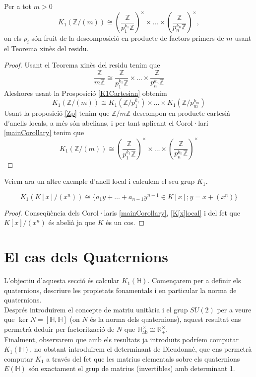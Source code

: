 \begin{prop}Per a tot $m>0$  \label{K1Zm}
$$
K_1(\mathbb{Z}/(m)) \cong \left(\frac{\mathbb{Z}}{p_1^{k_1}\mathbb{Z}}\right)^\times \times \dots \times \left(\frac{\mathbb{Z}}{p_n^{k_n}\mathbb{Z}}\right) ^ \times ,
$$
on els $p_i$ són fruit de la descomposició en producte de factors primers de $m$ usant el Teorema xinès del residu.
\end{prop}
\begin{proof}
Usant el Teorema xinès del residu tenim que 
$$
\frac{\mathbb{Z}}{m\mathbb{Z}} \cong \frac{\mathbb{Z}}{p_1^{k_1}\mathbb{Z}}\times \dots \times \frac{\mathbb{Z}}{p_n^{k_n}\mathbb{Z}}
$$
Aleshores usant la Prosposició \ref{K1Cartesian} obtenim
$$
K_1(\mathbb{Z}/(m)) \cong K_1(\mathbb{Z}/p_1^{k_1}) \times \dots \times K_1(\mathbb{Z}/p_m^{k_m})
$$
Usant la proposició \ref{Zp} tenim que $\mathbb{Z}/m\mathbb{Z}$ descompon en producte cartesià d'anells locals, a més són abelians, i per tant aplicant el Corol·lari \ref{mainCorollary} tenim que 
$$
K_1(\mathbb{Z}/(m)) \cong \left(\frac{\mathbb{Z}}{p_1^{k_1}\mathbb{Z}}\right)^\times \times \dots \times \left(\frac{\mathbb{Z}}{p_n^{k_n}\mathbb{Z}}\right) ^ \times
$$
\end{proof}

\indent Veiem ara un altre exemple d'anell local i calculem el seu grup $K_1$.

\begin{prop}
$$
K_1(K[x]/(x^n)) \cong \{a_1y+\dots + a_{n-1}y^{n-1} \in K[x] ; y = x + (x^n) \}
$$
\end{prop}
\begin{proof}
Conseqüència dels Corol·laris \ref{mainCorollary},  \ref{K[x]local} i del fet que $K[x]/(x^n)$ és abelià ja que $K$ és un cos.
\end{proof}

\section{El cas dels Quaternions}
L'objectiu d'aquesta secció és calcular $K_1(\mathbb{H})$. Començarem per a definir els quaternions, descriure les propietats fonamentals i en particular la norma de quaternions. 
\\ \indent Després introduirem el concepte de matriu unitària i el grup $SU(2)$ per a veure que $\ker N = [\mathbb{H},\mathbb{H}]$ (on $N$ és la norma dels quaternions), aquest resultat ens permetrà deduir per factorització de $N$ que $\mathbb{H}^\times_\text{ab}\cong \mathbb{R}^\times_+$. \\
\indent Finalment, observarem que amb els resultats ja introduïts podríem computar $K_1(\mathbb{H})$, no obstant introduirem el determinant de Dieudonné, que ens permetrà computar $K_1$ a través del fet que les matrius elementals sobre els quaternions $E(\mathbb{H})$ són exactament el grup de matrius (invertibles) amb determinant 1.
 
